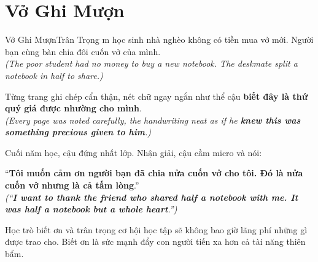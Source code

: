 \section{Vở Ghi Mượn}
\begin{truyen}{Vở Ghi Mượn}{Trân Trọng}
m học sinh nhà nghèo không có tiền mua vở mới. Người bạn cùng bàn chia đôi cuốn vở của mình.\\
\textit{(The poor student had no money to buy a new notebook. The deskmate split a notebook in half to share.)}

Từng trang ghi chép cẩn thận, nét chữ ngay ngắn như thể cậu \textbf{biết đây là thứ quý giá được nhường cho mình}.\\
\textit{(Every page was noted carefully, the handwriting neat as if he \textbf{knew this was something precious given to him}.)}

Cuối năm học, cậu đứng nhất lớp. Nhận giải, cậu cầm micro và nói:

``\textbf{Tôi muốn cảm ơn người bạn đã chia nửa cuốn vở cho tôi. Đó là nửa cuốn vở nhưng là cả tấm lòng}.''\\
\textit{(``\textbf{I want to thank the friend who shared half a notebook with me. It was half a notebook but a whole heart}.'')}
\end{truyen}
\begin{baihoc}
  Học trò biết ơn và trân trọng cơ hội học tập sẽ không bao giờ lãng phí những gì được trao cho. Biết ơn là sức mạnh đẩy con người tiến xa hơn cả tài năng thiên bẩm.
\end{baihoc}

